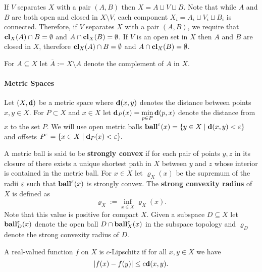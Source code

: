 If $V$ separates $X$ with a pair $(A, B)$ then $X = A\sqcup V\sqcup B$.
Note that while $A$ and $B$ are both open and closed in $X\setminus V$, each component $X_i = A_i\sqcup V_i\sqcup B_i$ is connected.
Therefore, if $V$ separates $X$ with a pair $(A, B)$, we require that $\mathbf{cl}_X(A)\cap B = \emptyset$ and $A\cap \mathbf{cl}_X(B) = \emptyset$.
If $V$ is an open set in $X$ then $A$ and $B$ are closed in $X$, therefore $\mathbf{cl}_X(A)\cap B = \emptyset$ and $A\cap \mathbf{cl}_X(B) = \emptyset$.

For $A\subseteq X$ let $\overline{A} := X\setminus A$ denote the complement of $A$ in $X$.

\paragraph{Metric Spaces}

Let $(X,\mathbf{d})$ be a metric space where $\mathbf{d}(x, y)$ denotes the distance between points $x,y\in X$.
For $P\subset X$ and $x\in X$ let $\mathbf{d}_P(x) = \displaystyle\min_{p\in P}\mathbf{d}(p, x)$ denote the distance from $x$ to the set $P$.
We will use open metric balls $\mathbf{ball}^\varepsilon(x) = \{y\in X\mid \mathbf{d}(x, y) < \varepsilon\}$ and offsets $P^\varepsilon = \{x\in X\mid \mathbf{d}_P(x) < \varepsilon\}.$

A metric ball is said to be \textbf{strongly convex} if for each pair of points $y,z$ in its closure of there exists a unique shortest path in $X$ between $y$ and $z$ whose interior is contained in the metric ball.
For $x\in X$ let $\varrho_X(x)$ be the supremum of the radii $\varepsilon$ such that $\mathbf{ball}^\varepsilon(x)$ is strongly convex.
The \textbf{strong convexity radius} of $X$ is defined as
\[ \varrho_X := \inf_{x\in X} \varrho_X(x).\]
Note that this value is positive for compact $X$.
Given a subspace $D\subseteq X$ let $\mathbf{ball}_D^\varepsilon(x)$ denote the open ball $D\cap \mathbf{ball}_X^\varepsilon(x)$ in the subspace topology and $\varrho_D$ denote the strong convexity radius of $D$.

A real-valued function $f$ on $X$ is $c$-Lipschitz if for all $x,y\in X$ we have
\[
  |f(x) - f(y)| \le c \mathbf{d}(x,y).
\]
